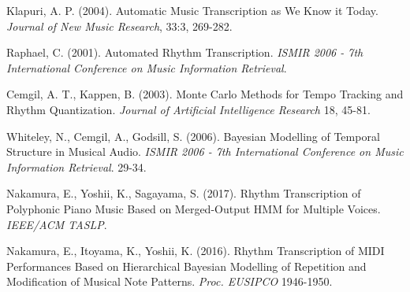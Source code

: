 \documentclass[11pt]{article}
\begin{document}
\begin{thebibliography}{1}

Klapuri, A. P. (2004). Automatic Music Transcription as We Know it Today. \textit{Journal of New Music Research}, 33:3, 269-282.

Raphael, C. (2001). Automated Rhythm Transcription.  \textit{ISMIR 2006 - 7th International Conference on Music Information Retrieval}.

Cemgil, A. T., Kappen, B. (2003). Monte Carlo Methods for Tempo Tracking and Rhythm Quantization. \textit{Journal of Artificial Intelligence Research} 18, 45-81.

Whiteley, N., Cemgil, A., Godsill, S. (2006). Bayesian Modelling of Temporal Structure in Musical Audio. \textit{ISMIR 2006 - 7th International Conference on Music Information Retrieval}. 29-34. 

Nakamura, E., Yoshii, K., Sagayama, S. (2017). Rhythm Transcription of
Polyphonic Piano Music Based on Merged-Output HMM for Multiple
Voices. \textit{IEEE/ACM TASLP}.

 Nakamura, E., Itoyama, K., Yoshii, K. (2016). Rhythm Transcription of MIDI Performances Based on Hierarchical Bayesian Modelling of Repetition and Modification of Musical Note Patterns. \textit{Proc. EUSIPCO} 1946-1950.

\end{thebibliography}
\end{document}
